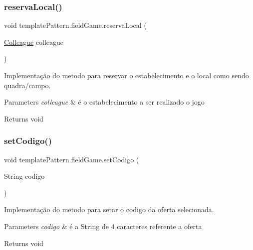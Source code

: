 \subsubsection{\texorpdfstring{reservaLocal()}{reservaLocal()}}
{\footnotesize\ttfamily void template\+Pattern.\+field\+Game.\+reserva\+Local (\begin{DoxyParamCaption}\item[{\mbox{\hyperlink{classmediator_pattern_1_1_colleague}{Colleague}}}]{colleague }\end{DoxyParamCaption})}



Implementação do metodo para reservar o estabelecimento e o local como sendo quadra/campo. 


\begin{DoxyParams}{Parameters}
{\em colleague} & é o estabelecimento a ser realizado o jogo \\
\hline
\end{DoxyParams}
\begin{DoxyReturn}{Returns}
void 
\end{DoxyReturn}
\mbox{\label{classtemplate_pattern_1_1field_game_ad8195a458cfc7d18034a895e65d0d9f7}} 
\subsubsection{\texorpdfstring{setCodigo()}{setCodigo()}}
{\footnotesize\ttfamily void template\+Pattern.\+field\+Game.\+set\+Codigo (\begin{DoxyParamCaption}\item[{String}]{codigo }\end{DoxyParamCaption})}



Implementação do metodo para setar o codigo da oferta selecionada. 


\begin{DoxyParams}{Parameters}
{\em codigo} & é a String de 4 caracteres referente a oferta \\
\hline
\end{DoxyParams}
\begin{DoxyReturn}{Returns}
void 
\end{DoxyReturn}
\mbox{\label{classtemplate_pattern_1_1field_game_a7b5e26de1410d30daf7d20fda2cb6c7f}} 
